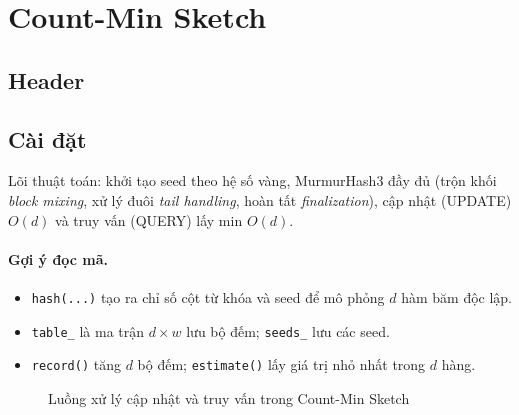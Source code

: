 \section{Count-Min Sketch}

\subsection{Header}



\subsection{Cài đặt}

Lõi thuật toán: khởi tạo seed theo hệ số vàng, MurmurHash3 đầy đủ (trộn khối \emph{block mixing}, xử lý đuôi \emph{tail handling}, hoàn tất \emph{finalization}), cập nhật (UPDATE) $O(d)$ và truy vấn (QUERY) lấy min $O(d)$.



\paragraph{Gợi ý đọc mã.}
\begin{itemize}
    \item \texttt{hash(...)} tạo ra chỉ số cột từ khóa và seed để mô phỏng $d$ hàm băm độc lập.
    \item \texttt{table\_} là ma trận $d \times w$ lưu bộ đếm; \texttt{seeds\_} lưu các seed.
    \item \texttt{record()} tăng $d$ bộ đếm; \texttt{estimate()} lấy giá trị nhỏ nhất trong $d$ hàng.
\end{itemize}

\begin{figure}[H]
\centering
{}
\caption{Luồng xử lý cập nhật và truy vấn trong Count-Min Sketch}
\end{figure}

